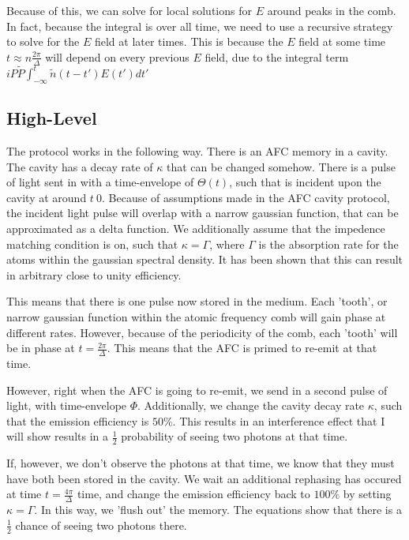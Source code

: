 \documentclass[12pt]{article}
\begin{document}
Because of this, we can solve for local solutions for $E$ around peaks in the comb. In fact,
because the integral is over all time, we need to use a recursive strategy to solve
for the $E$ field at later times. This is because the $E$ field at some time $t \approx n\frac{2\pi}{\Delta}$ will depend
	on every previous $E$ field, due to the integral term $ i P\tilde{P} \int^t_{-\infty} \tilde{n}(t-t') E(t') d t'$


\subsection{High-Level}
\label{description}
The protocol works in the following way. There is an AFC memory in a cavity. The cavity has a decay rate of $\kappa$ that can be changed somehow. There is a pulse of light sent in with a time-envelope of $\Theta(t)$, such that is incident
upon the cavity at around $t~0$. Because of assumptions made in the AFC cavity protocol, the incident light pulse will
overlap with a narrow gaussian function, that can be approximated as a delta function. We additionally assume that the
impedence matching condition is on, such that $\kappa = \Gamma$, where $\Gamma$ is the absorption rate for the atoms within the gaussian spectral density. It has been shown that this can result in arbitrary close to unity efficiency. 

This means that there is one pulse now stored in the medium. Each 'tooth', or narrow gaussian function within the atomic
frequency comb will gain phase at different rates. However, because of the periodicity of the comb, each 'tooth' will
be in phase at $t = \frac{2 \pi}{\Delta}$. This means that the AFC is primed to re-emit at that time. 

However, right when the AFC is going to re-emit, we send in a second pulse of light, with time-envelope $\Phi$. Additionally, we change the cavity decay rate $\kappa$, such that the emission efficiency is $50\%$. This results in an interference
effect that I will show results in a $\frac{1}{2}$ probability of seeing two photons at that time.

If, however, we don't observe the photons at that time, we know that they must have both been stored in the cavity. We wait an additional rephasing has occured at time $t = \frac{4\pi}{\Delta}$ time, and change the emission efficiency back to $100\%$ by setting $\kappa = \Gamma$. In this way, we 'flush out' the memory. The equations show that there is a $\frac{1}{2}$ chance of seeing two photons there.
\end{document}
